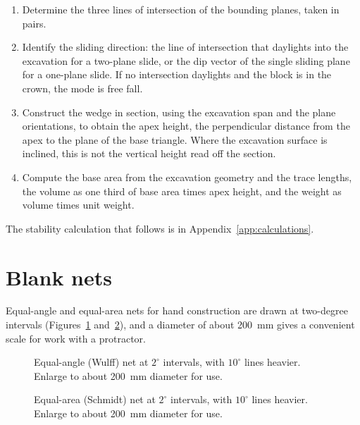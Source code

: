 \begin{enumerate}
  \item Determine the three lines of intersection of the bounding planes,
        taken in pairs.
  \item Identify the sliding direction: the line of intersection that
        daylights into the excavation for a two-plane slide, or the dip
        vector of the single sliding plane for a one-plane slide. If no
        intersection daylights and the block is in the crown, the mode is
        free fall.
  \item Construct the wedge in section, using the excavation span and the
        plane orientations, to obtain the apex height, the perpendicular
        distance from the apex to the plane of the base triangle. Where the
        excavation surface is inclined, this is not the vertical height read
        off the section.
  \item Compute the base area from the excavation geometry and the trace
        lengths, the volume as one third of base area times apex height, and
        the weight as volume times unit weight.
\end{enumerate}

The stability calculation that follows is in
Appendix~\ref{app:calculations}.

\section{Blank nets}
\label{sec:blank-nets}

Equal-angle and equal-area nets for hand construction are drawn at two-degree
intervals (Figures~\ref{fig:blank-wulff-net} and~\ref{fig:blank-schmidt-net}),
and a diameter of about 200~mm gives a convenient scale for work
with a protractor.

\begin{figure}[htbp]
\centering
{}
\caption{Equal-angle (Wulff) net at $2^\circ$ intervals, with $10^\circ$ lines heavier. Enlarge to about 200~mm diameter for use.}
\label{fig:blank-wulff-net}
\end{figure}

\begin{figure}[htbp]
\centering
{}
\caption{Equal-area (Schmidt) net at $2^\circ$ intervals, with $10^\circ$ lines heavier. Enlarge to about 200~mm diameter for use.}
\label{fig:blank-schmidt-net}
\end{figure}

\chapterreferences
